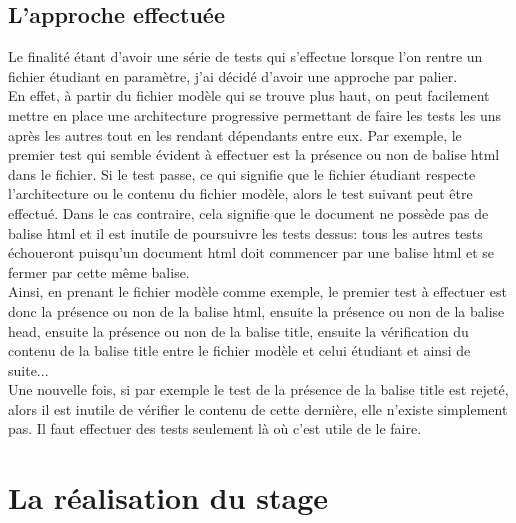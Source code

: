 \documentclass[12pt,twoside]{book}
\begin{document}
\section{L'approche effectuée}
Le finalité étant d'avoir une série de tests qui s'effectue lorsque l'on rentre un fichier étudiant en paramètre, j'ai décidé d'avoir une approche par palier.\\ En effet, à partir du fichier modèle qui se trouve plus haut, on peut facilement mettre en place une architecture progressive permettant de faire les tests les uns après les autres tout en les rendant dépendants entre eux. Par exemple, le premier test qui semble évident à effectuer est la présence ou non de balise html dans le fichier. Si le test passe, ce qui signifie que le fichier étudiant respecte l'architecture ou le contenu du fichier modèle, alors le test suivant peut être effectué. Dans le cas contraire, cela signifie que le document ne possède pas de balise html et il est inutile de poursuivre les tests dessus: tous les autres tests échoueront puisqu'un document html doit commencer par une balise html et se fermer par cette même balise.\\
Ainsi, en prenant le fichier modèle comme exemple, le premier test à effectuer est donc la présence ou non de la balise html, ensuite la présence ou non de la balise head, ensuite la présence ou non de la balise title, ensuite la vérification du contenu de la balise title entre le fichier modèle et celui étudiant et ainsi de suite...\\
Une nouvelle fois, si par exemple le test de la présence de la balise title est rejeté, alors il est inutile de vérifier le contenu de cette dernière, elle n'existe simplement pas. Il faut effectuer des tests seulement là où c'est utile de le faire.

\color{red}
\chapter{ La réalisation du stage}
\color{black}
\end{document}
